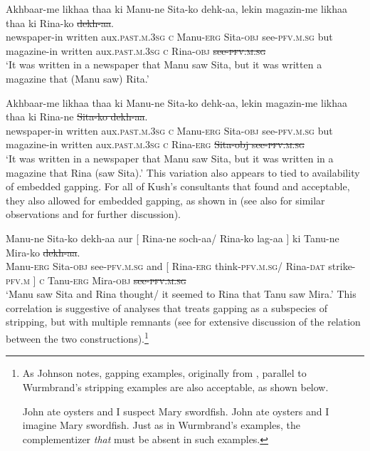 \documentclass[output=paper]{langscibook}
\begin{document}
\ea \label{maex11}
    \gll Akhbaar-me likhaa thaa ki Manu-ne Sita-ko dehk-aa, lekin magazin-me likhaa thaa ki Rina-ko \sout{dekh-aa}.\\
    newspaper-in written aux.\textsc{past.m.3sg} \textsc{c} Manu-\textsc{erg} Sita-\textsc{obj} see-\textsc{pfv.m.sg} but magazine-in written aux.\textsc{past.m.3sg} \textsc{c} Rina-\textsc{obj} \sout{see-\textsc{pfv.m.sg}}\\
    \glt `It was written in a newspaper that Manu saw Sita, but it was written a magazine that (Manu saw) Rita.'
    
\ex \label{maex12}
    \gll Akhbaar-me likhaa thaa ki Manu-ne Sita-ko dehk-aa, lekin magazin-me likhaa thaa ki Rina-ne \sout{Sita-ko dekh-aa}.\\
    newspaper-in written aux.\textsc{past.m.3sg} \textsc{c} Manu-\textsc{erg} Sita-\textsc{obj} see-\textsc{pfv.m.sg} but magazine-in written aux.\textsc{past.m.3sg} \textsc{c} Rina-\textsc{erg} \sout{Sita-obj see-\textsc{pfv.m.sg}}\\
    \glt `It was written in a newspaper that Manu saw Sita, but it was written in a magazine that Rina (saw Sita).' \hfill \citep[70 \& 71]{kush16}
\z 
This variation also appears to tied to availability of embedded gapping. For all of Kush's consultants that found  and  acceptable, they also allowed for embedded gapping, as shown in  (see also \citealt{farudi2013} for similar observations and for further discussion).

\ea \label{maex13}
    \gll Manu-ne Sita-ko dekh-aa aur [ Rina-ne soch-aa/ Rina-ko lag-aa ] ki Tanu-ne Mira-ko \sout{dekh-aa}.\\
    Manu-\textsc{erg} Sita-\textsc{obj} see-\textsc{pfv.m.sg} and [ Rina-\textsc{erg} think-\textsc{pfv.m.sg}/ Rina-\textsc{dat} strike-\textsc{pfv.m} ] \textsc{c} Tanu-\textsc{erg} Mira-\textsc{obj} \sout{see-\textsc{pfv.m.sg}}\\
    \glt `Manu saw Sita and Rina thought/ it seemed to Rina that Tanu saw Mira.' \hfill \citep[53]{kush16}
\z 
This correlation is suggestive of analyses that treats gapping as a subspecies of stripping, but with multiple remnants (see \citealt{johnson18} for extensive discussion of the relation between the two constructions).\footnote{As Johnson notes, gapping examples, originally from \cite{weir14}, parallel to Wurmbrand's stripping examples are also acceptable, as shown below.

\ea 
    \ea 
        John ate oysters and I suspect Mary swordfish.
    \ex 
        John ate oysters and I imagine Mary swordfish. \hfill \citep[333]{weir14}
    \z 
\z 
Just as in Wurmbrand's examples, the complementizer \emph{that} must be absent in such examples.}
\end{document}
